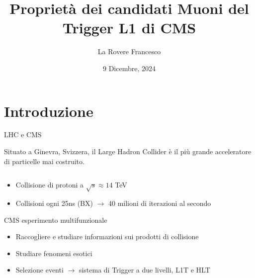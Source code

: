 \documentclass{beamer}
\title{Proprietà dei candidati Muoni del Trigger L1 di CMS}
\author[La Rovere Francesco]{La Rovere Francesco}
\date{9 Dicembre, 2024}
\begin{document}
\footnotesize

\frame{\titlepage}

\section{Introduzione}

\begin{frame}{LHC e CMS}

Situato a Ginevra, Svizzera, il Large Hadron Collider è il più grande acceleratore di particelle mai costruito. 

\begin{columns}
    \begin{column}{0.55\textwidth}
        \begin{itemize}            
            \item Collisione di protoni a $\sqrt{s} \approx 14$ TeV
            \item Collisioni ogni 25ns (BX) $\rightarrow$ 40 milioni di iterazioni al secondo
        \end{itemize}

        CMS esperimento multifunzionale
        \begin{itemize}
            \item Raccogliere e studiare informazioni sui prodotti di collisione
            \item Studiare fenomeni esotici
            \item Selezione eventi $\rightarrow$ sistema di Trigger a due livelli, L1T e HLT
        \end{itemize}
    \end{column}
    \begin{column}{0.4\textwidth}  
    \centering
       \vskip 0.5cm %
    \end{column}
\end{columns}

\end{frame}
\end{document}
